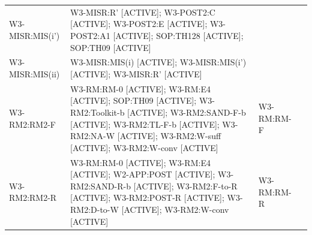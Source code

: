 \begin{longtable}{p{2.6cm}p{7cm}p{2.6cm}p{2cm}}
W3-MISR:MIS(i') & W3-MISR:R' [ACTIVE]; W3-POST2:C [ACTIVE]; W3-POST2:E [ACTIVE]; W3-POST2:A1 [ACTIVE]; SOP:TH128 [ACTIVE]; SOP:TH09 [ACTIVE] &  &  \\
W3-MISR:MIS(ii) & W3-MISR:MIS(i) [ACTIVE]; W3-MISR:MIS(i') [ACTIVE]; W3-MISR:R' [ACTIVE] &  &  \\
W3-RM2:RM2-F & W3-RM:RM-0 [ACTIVE]; W3-RM:E4 [ACTIVE]; SOP:TH09 [ACTIVE]; W3-RM2:Toolkit-b [ACTIVE]; W3-RM2:SAND-F-b [ACTIVE]; W3-RM2:TL-F-b [ACTIVE]; W3-RM2:NA-W [ACTIVE]; W3-RM2:W-suff [ACTIVE]; W3-RM2:W-conv [ACTIVE] & W3-RM:RM-F &  \\
W3-RM2:RM2-R & W3-RM:RM-0 [ACTIVE]; W3-RM:E4 [ACTIVE]; W2-APP:POST [ACTIVE]; W3-RM2:SAND-R-b [ACTIVE]; W3-RM2:F-to-R [ACTIVE]; W3-RM2:POST-R [ACTIVE]; W3-RM2:D-to-W [ACTIVE]; W3-RM2:W-conv [ACTIVE] & W3-RM:RM-R &  \\
\end{longtable}
